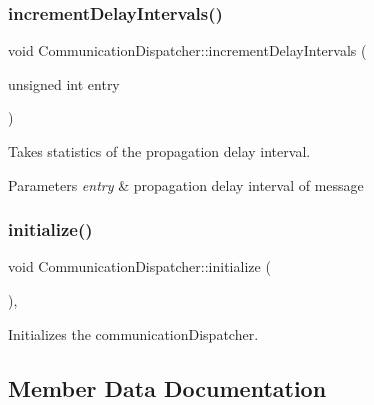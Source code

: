 \subsubsection{\texorpdfstring{increment\+Delay\+Intervals()}{incrementDelayIntervals()}}
{\footnotesize\ttfamily void Communication\+Dispatcher\+::increment\+Delay\+Intervals (\begin{DoxyParamCaption}\item[{unsigned int}]{entry }\end{DoxyParamCaption})\hspace{0.3cm}{\ttfamily [private]}}



Takes statistics of the propagation delay interval. 


\begin{DoxyParams}{Parameters}
{\em entry} & propagation delay interval of message \\
\hline
\end{DoxyParams}
\mbox{\label{class_communication_dispatcher_ab44887658841bb5ab59c554c1738c8f3}} 
\subsubsection{\texorpdfstring{initialize()}{initialize()}}
{\footnotesize\ttfamily void Communication\+Dispatcher\+::initialize (\begin{DoxyParamCaption}{ }\end{DoxyParamCaption})\hspace{0.3cm}{\ttfamily [private]}, {\ttfamily [virtual]}}



Initializes the communication\+Dispatcher. 



\subsection{Member Data Documentation}
\mbox{\label{class_communication_dispatcher_acd67954c5bf9280a33d069ae4b217e1c}} 
